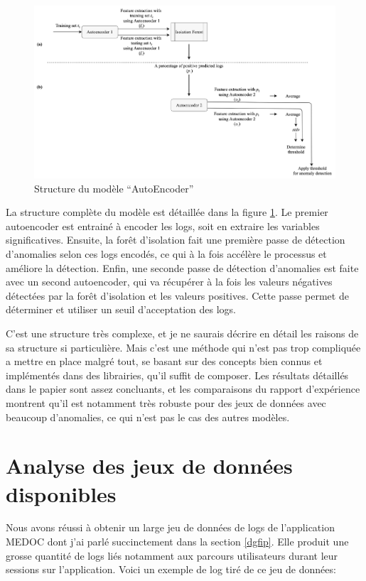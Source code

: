 \documentclass[openany, 11pt]{memoir}
\begin{document}
\begin{figure}[ht]
	\centering
	\includegraphics[width=\textwidth]{images/modeleautoencoder.png}
	\caption{Structure du modèle ``AutoEncoder''}
	\label{modeleautoencoder}
\end{figure}

\bigskip
La structure complète du modèle est détaillée dans la figure \ref{modeleautoencoder}. Le premier autoencoder est entrainé à encoder les \glspl{log}, soit en extraire les variables significatives. Ensuite, la forêt d'isolation fait une première passe de détection d'anomalies selon ces \glspl{log} encodés, ce qui à la fois accélère le processus et améliore la détection. Enfin, une seconde passe de détection d'anomalies est faite avec un second autoencoder, qui va récupérer à la fois les valeurs négatives détectées par la forêt d'isolation et les valeurs positives. Cette passe permet de déterminer et utiliser un seuil d'acceptation des \glspl{log}.

C'est une structure très complexe, et je ne saurais décrire en détail les raisons de sa structure si particulière. Mais c'est une méthode qui n'est pas trop compliquée a mettre en place malgré tout, se basant sur des concepts bien connus et implémentés dans des librairies, qu'il suffit de composer. Les résultats détaillés dans le papier sont assez concluants, et les comparaisons du rapport d'expérience \cite{experiencereport} montrent qu'il est notamment très robuste pour des jeux de données avec beaucoup d'anomalies, ce qui n'est pas le cas des autres modèles.

\section{Analyse des jeux de données disponibles}

Nous avons réussi à obtenir un large jeu de données de \glspl{log} de l'application \gls{MEDOC} dont j'ai parlé succinctement dans la section \ref{dgfip}. Elle produit une grosse quantité de \glspl{log} liés notamment aux parcours utilisateurs durant leur sessions sur l'application. Voici un exemple de \gls{log} tiré de ce jeu de données:
\end{document}
